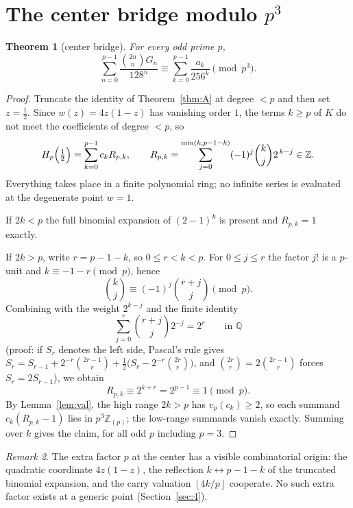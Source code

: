 \documentclass[11pt]{amsart}
\newtheorem{theorem}{Theorem}[section]
\theoremstyle{definition}
\theoremstyle{remark}
\newtheorem{remark}[theorem]{Remark}
\newcommand{\Q}{\mathbb{Q}}
\newcommand{\Z}{\mathbb{Z}}
\newcommand{\Zp}{\mathbb{Z}_{(p)}}
\newcommand{\fl}[1]{\left\lfloor #1 \right\rfloor}
\begin{document}
\section{The center bridge modulo \texorpdfstring{$p^3$}{p-cubed}}\label{sec:3}

\begin{theorem}[center bridge]\label{thm:B}
For every odd prime $p$,
\[
\sum_{n=0}^{p-1}\frac{\binom{2n}{n}G_n}{128^n}
\equiv\sum_{k=0}^{p-1}\frac{a_k}{256^k}\pmod{p^3}.
\]
\end{theorem}

\begin{proof}
Truncate the identity of Theorem~\ref{thm:A} at degree $<p$ and then set
$z=\frac12$. Since $w(z)=4z(1-z)$ has vanishing order $1$, the terms
$k\ge p$ of $K$ do not meet the coefficients of degree $<p$, so
\begin{equation}\label{eq:Rpk}
H_p\Bigl(\tfrac12\Bigr)=\sum_{k=0}^{p-1}c_kR_{p,k},
\qquad
R_{p,k}=\sum_{j=0}^{\min(k,p-1-k)}(-1)^j\binom{k}{j}2^{\,k-j}\in\Z .
\end{equation}
Everything takes place in a finite polynomial ring; no infinite series is
evaluated at the degenerate point $w=1$.

If $2k<p$ the full binomial expansion of $(2-1)^k$ is present and
$R_{p,k}=1$ exactly.

If $2k>p$, write $r=p-1-k$, so $0\le r<k<p$. For $0\le j\le r$ the
factor $j!$ is a $p$-unit and $k\equiv-1-r\pmod p$, hence
\[
\binom{k}{j}\equiv(-1)^j\binom{r+j}{j}\pmod p .
\]
Combining with the weight $2^{k-j}$ and the finite identity
\begin{equation}\label{eq:pascal}
\sum_{j=0}^{r}\binom{r+j}{j}2^{-j}=2^r
\qquad\text{in }\Q
\end{equation}
(proof: if $S_r$ denotes the left side, Pascal's rule gives
$S_r=S_{r-1}+2^{-r}\binom{2r-1}{r}+\frac12\bigl(S_r-2^{-r}\binom{2r}{r}\bigr)$,
and $\binom{2r}{r}=2\binom{2r-1}{r}$ forces $S_r=2S_{r-1}$), we obtain
\[
R_{p,k}\equiv2^{k+r}=2^{p-1}\equiv1\pmod p .
\]
By Lemma~\ref{lem:val}, the high range $2k>p$ has $v_p(c_k)\ge2$, so each
summand $c_k(R_{p,k}-1)$ lies in $p^3\Zp$; the low-range summands vanish
exactly. Summing over $k$ gives the claim, for all odd $p$ including
$p=3$.
\end{proof}

\begin{remark}
The extra factor $p$ at the center has a visible combinatorial origin:
the quadratic coordinate $4z(1-z)$, the reflection
$k\leftrightarrow p-1-k$ of the truncated binomial expansion, and the
carry valuation $\fl{4k/p}$ cooperate. No such extra factor exists at a
generic point (Section~\ref{sec:4}).
\end{remark}
\end{document}
